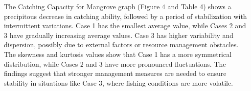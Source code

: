 \documentclass[final,5p,times,twocolumn,authoryear]{elsarticle}
\begin{document}
\begin{table}[htbp]
    \centering
    \caption{Catching Capacity Mangrove - Statistical Analysis}
\end{table}
The Catching Capacity for Mangrove graph (Figure 4 and Table 4) shows a precipitous decrease in catching ability, followed by a period of stabilization with intermittent variations. Case 1 has the smallest average value, while Cases 2 and 3 have gradually increasing average values. Case 3 has higher variability and dispersion, possibly due to external factors or resource management obstacles. The skewness and kurtosis values show that Case 1 has a more symmetrical distribution, while Cases 2 and 3 have more pronounced fluctuations. The findings suggest that stronger management measures are needed to ensure stability in situations like Case 3, where fishing conditions are more volatile.\\
\end{document}
